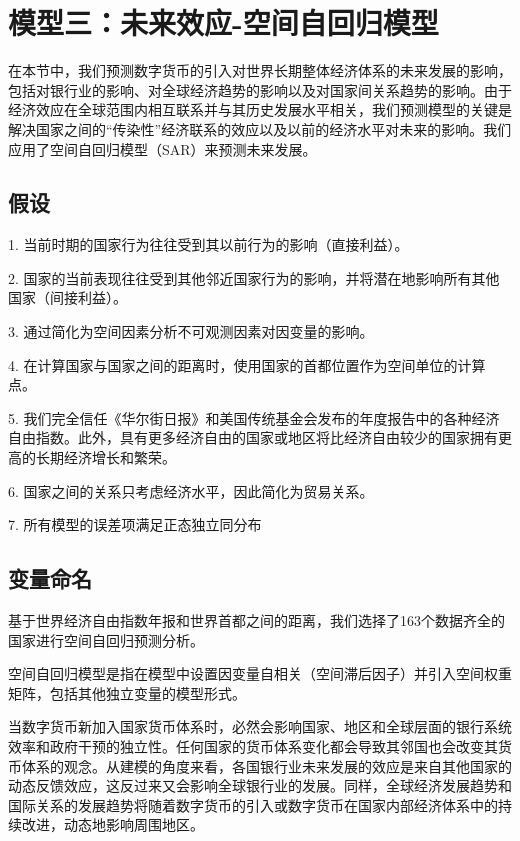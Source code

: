 \documentclass[withoutpreface,bwprint]{cumcmthesis} %
\begin{document}
\section{模型三：未来效应-空间自回归模型}
在本节中，我们预测数字货币的引入对世界长期整体经济体系的未来发展的影响，包括对银行业的影响、对全球经济趋势的影响以及对国家间关系趋势的影响。由于经济效应在全球范围内相互联系并与其历史发展水平相关，我们预测模型的关键是解决国家之间的“传染性”经济联系的效应以及以前的经济水平对未来的影响。我们应用了空间自回归模型（SAR）来预测未来发展。

\subsection{假设}
1. 当前时期的国家行为往往受到其以前行为的影响（直接利益）。

2. 国家的当前表现往往受到其他邻近国家行为的影响，并将潜在地影响所有其他国家（间接利益）。

3. 通过简化为空间因素分析不可观测因素对因变量的影响。

4. 在计算国家与国家之间的距离时，使用国家的首都位置作为空间单位的计算点。

5. 我们完全信任《华尔街日报》和美国传统基金会发布的年度报告中的各种经济自由指数。此外，具有更多经济自由的国家或地区将比经济自由较少的国家拥有更高的长期经济增长和繁荣。

6. 国家之间的关系只考虑经济水平，因此简化为贸易关系。

7. 所有模型的误差项满足正态独立同分布

\subsection{变量命名}
基于世界经济自由指数年报和世界首都之间的距离，我们选择了163个数据齐全的国家进行空间自回归预测分析。

空间自回归模型是指在模型中设置因变量自相关（空间滞后因子）并引入空间权重矩阵，包括其他独立变量的模型形式。

当数字货币新加入国家货币体系时，必然会影响国家、地区和全球层面的银行系统效率和政府干预的独立性。任何国家的货币体系变化都会导致其邻国也会改变其货币体系的观念。从建模的角度来看，各国银行业未来发展的效应是来自其他国家的动态反馈效应，这反过来又会影响全球银行业的发展。同样，全球经济发展趋势和国际关系的发展趋势将随着数字货币的引入或数字货币在国家内部经济体系中的持续改进，动态地影响周围地区。
\end{document}
